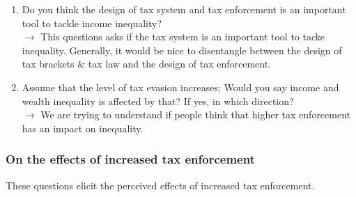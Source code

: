 \documentclass[12pt]{article}
\begin{document}
\begin{enumerate}
    \item Do you think the design of tax system and tax enforcement is an important tool to tackle income inequality? \\$\rightarrow$ This questions asks if the tax system is an important tool to tacke inequality. Generally, it would be nice to disentangle between the design of tax brackets \& tax law and the design of tax enforcement.  
    \item Assume that the level of tax evasion increases; Would you say income and wealth inequality is affected by that? If yes, in which direction? \\ $\rightarrow$ We are trying to understand if people think that higher tax enforcement has an impact on inequality. 
\end{enumerate}
\subsubsection{On the effects of increased tax enforcement}
These questions elicit the perceived effects of increased tax enforcement. 
\end{document}
